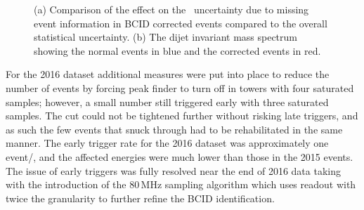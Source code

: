 \begin{figure}[ht!]
	\centering
	\hspace{0.05\columnwidth}%
	\caption{(a) Comparison of the effect on the \mjj~uncertainty due to missing event information in BCID corrected events compared to the overall statistical uncertainty.  (b) The dijet invariant mass spectrum showing the normal events in blue and the corrected events in red.}
	\label{fig:Mistimed}
\end{figure}

For the 2016 dataset additional measures were put into place to reduce the number of events by forcing peak finder to turn off in towers with four saturated samples; however, a small number still triggered early with three saturated samples.  The cut could not be tightened further without risking late triggers, and as such the few events that snuck through had to be rehabilitated in the same manner.  The early trigger rate for the 2016 dataset was approximately one event/\ifb, and the affected energies were much lower than those in the 2015 events.  The issue of early triggers was fully resolved near the end of 2016 data taking with the introduction of the 80\,MHz sampling algorithm which uses readout with twice the granularity to further refine the BCID identification.